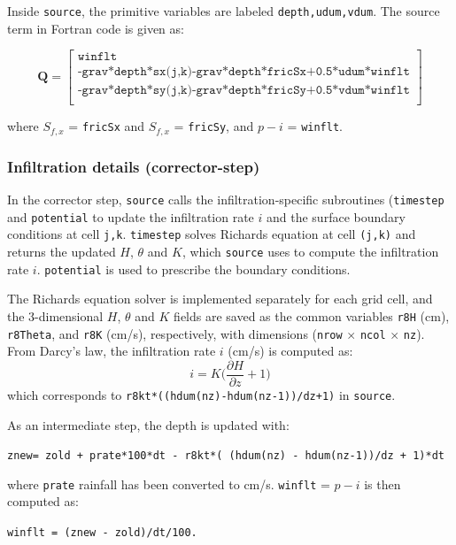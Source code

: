 \documentclass{article}
\newcommand{\code}[1]{\texttt{#1}}
\begin{document}
Inside \code{source}, the primitive variables are labeled \code{depth,udum,vdum}. 
The source term in Fortran code is given as:

\[ \mathbf{Q} = 
 \begin{bmatrix}
	\code{winflt}  \\[.1cm]
	\code{-grav*depth*sx(j,k)-grav*depth*fricSx+0.5*udum*winflt}\\[.1cm]
	\code{-grav*depth*sy(j,k)-grav*depth*fricSy+0.5*vdum*winflt}\\[.1cm]
\end{bmatrix} 
\]

where $S_{f,x}$ = \code{fricSx} and  $S_{f,x}$ = \code{fricSy}, and $p-i$ = \code{winflt}.


\subsubsection*{Infiltration details (corrector-step)}

In the corrector step, \code{source} calls the infiltration-specific subroutines (\code{timestep} and \code{potential} to update the infiltration rate $i$ and the surface boundary conditions at cell \code{j,k}. 
\code{timestep} solves Richards equation at cell \code{(j,k)} and returns the updated $H$, $\theta$ and $K$, which \code{source} uses to compute the infiltration rate $i$. \code{potential} is used to prescribe the boundary conditions. 

 The Richards equation solver is implemented separately for each grid cell, and the 3-dimensional $H$, $\theta$ and $K$  fields are saved as the common variables \code{r8H} (cm), \code{r8Theta}, and  \code{r8K} (cm/s), respectively, with dimensions (\code{nrow} $\times$ \code{ncol} $\times$ \code{nz}).\\ 



\noindent From Darcy's law, the infiltration rate $i$ (cm/s) is computed as:
$$ i =  K \bigg(\frac{\partial H}{\partial z} + 1\bigg ) $$
which corresponds to \code{r8kt*((hdum(nz)-hdum(nz-1))/dz+1)} in \code{source}.

\noindent  As an intermediate step, the depth is updated with: \\
\begin{center}
\code{znew=  zold + prate*100*dt - r8kt*( (hdum(nz) - hdum(nz-1))/dz + 1)*dt } 	
\end{center}
where \code{prate}  rainfall has been converted to cm/s.
 \code{winflt} = $p-i$  is then computed as:
\begin{center}
 \code{winflt = (znew - zold)/dt/100.} 	
\end{center}
\end{document}
